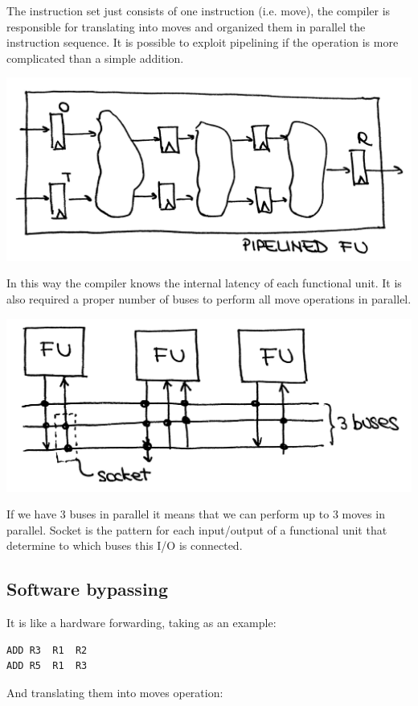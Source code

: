 The instruction set just consists of one instruction (i.e. move), the compiler is responsible for translating into moves and organized them in parallel the instruction sequence. It is possible to exploit pipelining if the operation is more complicated than a simple addition.

\begin{center}
  \includegraphics[width=0.7\linewidth]{img/img3/8}
\end{center}

In this way the compiler knows the internal latency of each functional unit. It is also required a proper number of buses to perform all move operations in parallel.

\begin{center}
  \includegraphics[width=0.7\linewidth]{img/img3/9}
\end{center}

If we have 3 buses in parallel it means that we can perform up to 3 moves in parallel. Socket is the pattern for each input/output of a functional unit that determine to which buses this I/O is connected.

\subsection{Software bypassing}

It is like a hardware forwarding, taking as an example:

\begin{verbatim}
ADD R3  R1  R2
ADD R5  R1  R3
\end{verbatim}

And translating them into moves operation:

